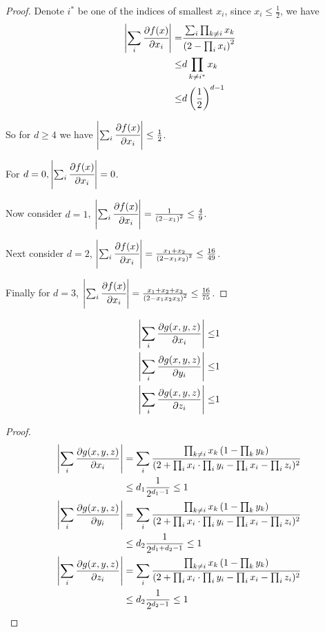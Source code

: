 	\begin{proof}
		Denote $i^*$ be one of the indices of smallest $x_i$, since $x_i \leq \frac{1}{2}$, we have
	\begin{align*}
		\left\vert\sum_i \cfrac{\partial f(x)}{\partial x_i}\right\vert  =& \cfrac{\sum_i \prod_{k \neq i} x_k  }{\left( 2 - \prod_i x_i \right)^2} \\
		\leq & d \prod_{k \neq i^*} x_k \\
		\leq & d \left( \frac{1}{2} \right)^{d-1}
	\end{align*}

	So for $d \geq 4$ we have $\left\vert\sum_i \cfrac{\partial f(x)}{\partial x_i}\right\vert \leq \frac{1}{2}$.

	For $d=0, \left\vert\sum_i \cfrac{\partial f(x)}{\partial x_i}\right\vert = 0$.

	Now consider $d=1$, $\left\vert\sum_i \cfrac{\partial f(x)}{\partial x_i}\right\vert = \frac{1}{\left( 2 - x_1 \right)^2} \leq \frac{4}{9} $.

	Next consider $d=2$,  $\left\vert\sum_i \cfrac{\partial f(x)}{\partial x_i}\right\vert = \frac{x_1 + x_2}{\left( 2 - x_1x_2 \right)^2} \leq \frac{16}{49} $.

	Finally for $d=3$,  $\left\vert\sum_i \cfrac{\partial f(x)}{\partial x_i}\right\vert = \frac{x_1 + x_2 + x_3}{\left( 2 - x_1x_2x_3 \right)^2} \leq \frac{16}{75} $.
	\end{proof}


	\begin{Lem}
		\begin{align*}
			\left\vert \sum_i \frac{\partial g(x,y,z)}{\partial x_i} \right\vert \leq & 1 \\
			\left\vert \sum_i \frac{\partial g(x,y,z)}{\partial y_i} \right\vert \leq & 1 \\
			\left\vert \sum_i \frac{\partial g(x,y,z)}{\partial z_i} \right\vert \leq & 1 
		\end{align*}
	\end{Lem}

	\begin{proof}
		\begin{align*}
		\left\vert \sum_i \frac{\partial g(x,y,z)}{\partial x_i} \right\vert &= \sum_i \frac{\prod_{k\neq i} x_k \left( 1 - \prod_k y_k \right)}{(2+\prod_i x_i \cdot \prod_i y_i - \prod_i x_i - \prod_i z_i)^2} \\
		&\leq d_1 \frac{1}{2^{d_1 - 1}}  \leq 1 \\
		\left\vert \sum_i \frac{\partial g(x,y,z)}{\partial y_i} \right\vert &= \sum_i \frac{\prod_{k\neq i} x_k \left( 1 - \prod_k y_k \right)}{(2+\prod_i x_i \cdot \prod_i y_i - \prod_i x_i - \prod_i z_i)^2} \\
		&\leq d_2 \frac{1}{2^{d_1 + d_2 - 1}} \leq 1 \\
		\left\vert \sum_i \frac{\partial g(x,y,z)}{\partial z_i} \right\vert &= \sum_i \frac{\prod_{k\neq i} x_k \left( 1 - \prod_k y_k \right)}{(2+\prod_i x_i \cdot \prod_i y_i - \prod_i x_i - \prod_i z_i)^2} \\
		&\leq d_2 \frac{1}{2^{d_2 - 1}} \leq 1 \\
		\end{align*}
	\end{proof}

